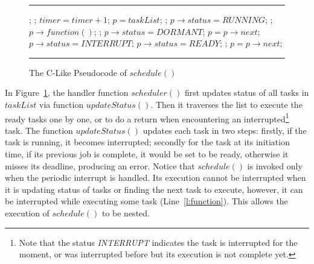 \documentclass[10pt,journal,compsoc]{IEEEtran}
\begin{document}
\begin{figure}[!t]
\hrule\vspace{1mm}
  \begin{algorithmic}[1]
  \State {};  \label{l:1stline}
  \State {}; \label{l:updatestatus}
  \State $timer = timer + 1$; \label{l:timer} \label{l:inc}
  \State $p = taskList$;
   \label{l:startrun1st}
      \State \Return;
      \State $p\rightarrow status = \textit{RUNNING}$;
      \State {};  \label{l:endrun1st}
      \State $p\rightarrow function()$;  \label{l:function}
      \State {};
      \State $p\rightarrow status = \textit{DORMANT}$;
    \EndIf
    \State $p = p\rightarrow next$;
  \EndWhile
\EndFunction
{}
     \label{l:startupdate}
      \State $p\rightarrow status = \textit{INTERRUPT}$;
    \EndIf
     
        
        \State $p\rightarrow status = \textit{READY}$;
      \Else {}
	\State {}; 
      \EndIf
    \EndIf \label{l:endupdate}
    \State $p = p\rightarrow next$;
  \EndWhile
\EndFunction
  \end{algorithmic}
\hrule
  \caption{The C-Like Pseudocode of $schedule()$}
  \label{a:schedule}
\end{figure}

In Figure~\ref{a:schedule}, the handler function $scheduler()$
first updates status of all tasks in $taskList$ via function
$updateStatus()$. Then it traverses the list to execute the ready
tasks one by one, or to do a return when encountering an
interrupted\footnote{Note that the status \textit{INTERRUPT} indicates
  the task is interrupted for the moment, or was interrupted before
  but its execution is not complete yet.} task. The function
$updateStatus()$ updates each task in two steps: firstly, if the task
is running, it becomes interrupted; secondly for the task at its
initiation time, if its previous job is complete, it would be set to
be ready, otherwise it misses its deadline, producing an error. Notice
that $schedule()$ is invoked only when the periodic interrupt is
handled. Its execution cannot be interrupted when it is updating
status of tasks or finding the next task to execute, however, it can
be interrupted while executing some task (Line~\ref{l:function}). This
allows the execution of $schedule()$ to be nested.
\end{document}
